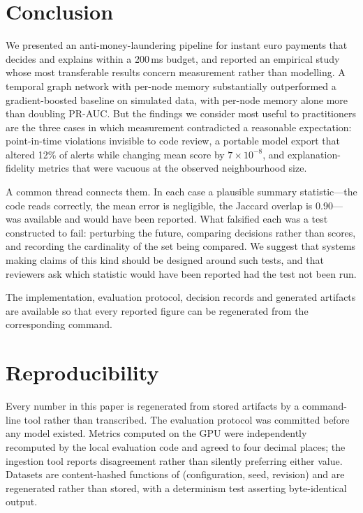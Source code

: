 \documentclass[conference]{IEEEtran}
\begin{document}
\section{Conclusion}

We presented an anti-money-laundering pipeline for instant euro payments that
decides and explains within a 200\,ms budget, and reported an empirical study
whose most transferable results concern measurement rather than modelling. A
temporal graph network with per-node memory substantially outperformed a
gradient-boosted baseline on simulated data, with per-node memory alone more
than doubling PR-AUC. But the findings we consider most useful to practitioners
are the three cases in which measurement contradicted a reasonable expectation:
point-in-time violations invisible to code review, a portable model export that
altered 12\% of alerts while changing mean score by $7\times10^{-8}$, and
explanation-fidelity metrics that were vacuous at the observed neighbourhood
size.

A common thread connects them. In each case a plausible summary statistic---the
code reads correctly, the mean error is negligible, the Jaccard overlap is
0.90---was available and would have been reported. What falsified each was a
test constructed to fail: perturbing the future, comparing decisions rather than
scores, and recording the cardinality of the set being compared. We suggest that
systems making claims of this kind should be designed around such tests, and
that reviewers ask which statistic would have been reported had the test not
been run.

The implementation, evaluation protocol, decision records and generated
artifacts are available so that every reported figure can be regenerated from
the corresponding command.

\section*{Reproducibility}

Every number in this paper is regenerated from stored artifacts by a
command-line tool rather than transcribed. The evaluation protocol was committed
before any model existed. Metrics computed on the GPU were independently
recomputed by the local evaluation code and agreed to four decimal places; the
ingestion tool reports disagreement rather than silently preferring either
value. Datasets are content-hashed functions of (configuration, seed, revision)
and are regenerated rather than stored, with a determinism test asserting
byte-identical output.
\end{document}
